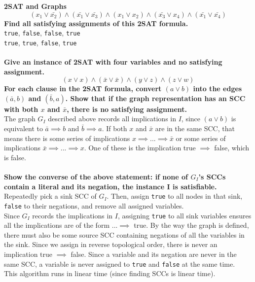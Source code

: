 \newpage
\begin{problem}{3.28}
    \textbf{2SAT and Graphs}
    \[
        (x_1 \lor \bar{x_2}) \wedge (\bar{x_1} \lor \bar{x_3}) \wedge (x_1 \lor x_2) \wedge (\bar{x_3} \lor x_4) \wedge (\bar{x_1} \lor \bar{x_4})
    \]
    \textbf{Find all satisfying assignments of this 2SAT formula.}
    \\
    \texttt{true}, \texttt{false}, \texttt{false}, \texttt{true}
    \\
    \texttt{true}, \texttt{true}, \texttt{false}, \texttt{true}
    \\
    \\
    \textbf{Give an instance of 2SAT with four variables and no satisfying assignment.}
    \[
        (x \lor x) \wedge (\bar{x} \lor \bar{x}) \wedge (y \lor z) \wedge (z \lor w)
    \]
    \textbf{For each clause in the 2SAT formula, convert $(a \lor b)$ into the edges $(\bar{a}, b)$ and $(\bar{b}, a)$. Show that if the graph representation has an SCC with both $x$ and $\bar{x}$, there is no satisfying assignment.}
    \\
    The graph $G_I$ described above records all implications in $I$, since $(a \lor b)$ is equivalent to $\bar{a} \implies b$ and $\bar{b} \implies a$. If both $x$ and $\bar{x}$ are in the same SCC, that means there is some series of implications $x \implies ... \implies \bar{x}$ or some series of implications $\bar{x} \implies ... \implies x$. One of these is the implication true $\implies$ false, which is false.
    \\
    \\
    \textbf{Show the converse of the above statement: if none of $G_I$'s SCCs contain a literal and its negation, the instance I is satisfiable.}
    \\
    Repeatedly pick a sink SCC of $G_I$. Then, assign \texttt{true} to all nodes in that sink, \texttt{false} to their negations, and remove all assigned variables. 
    \\
    Since $G_I$ records the implications in $I$, assigning \texttt{true} to all sink variables ensures all the implications are of the form $... \implies$ true. By the way the graph is defined, there must also be some source SCC containing negations of all the variables in the sink. Since we assign in reverse topological order, there is never an implication true $\implies$ false. Since a variable and its negation are never in the same SCC, a variable is never assigned to \texttt{true} and \texttt{false} at the same time.
    \\
    This algorithm runs in linear time (since finding SCCs is linear time). 

\end{problem}

